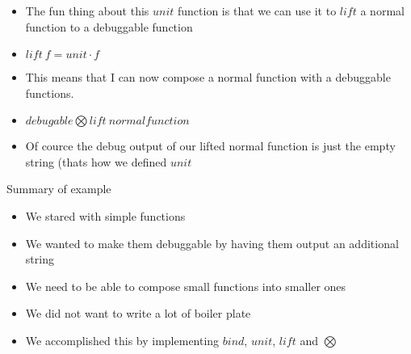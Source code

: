 \begin{frame}[fragile]
    \frametitle{}
    \begin{block}{}
        \begin{itemize}
            \item The fun thing about this $unit$ function is that we can use it to $lift$ a normal function to a debuggable function
            \item $lift \: f = unit \cdot f$
            \item This means that I can now compose a normal function with a debuggable functions.
            \item $debugable \bigotimes lift \: normalfunction$
            \item Of cource the debug output of our lifted normal function is just the empty string (thats how we defined $unit$
        \end{itemize}
    \end{block}
\end{frame}

\begin{frame}[fragile]{}
    \begin{block}{Summary of example}
        \begin{itemize}
            \item We stared with simple functions
            \item We wanted to make them debuggable by having them output an additional string
            \item We need to be able to compose small functions into smaller ones
            \item We did not want to write a lot of boiler plate
            \item We accomplished this by implementing $bind$, $unit$, $lift$ and $\bigotimes$
        \end{itemize}
    \end{block}
\end{frame}

